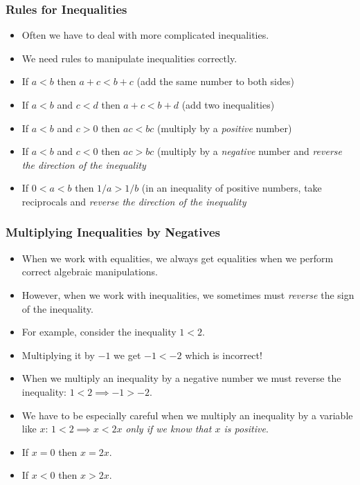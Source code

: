 \documentclass[serif,ignorenonframetext]{beamer}
\begin{document}
\begin{frame}
  \frametitle{Rules for Inequalities}
  \begin{itemize}[<+->]
  \item Often we have to deal with more complicated inequalities.
  \item We need rules to manipulate inequalities correctly.
  \item If $a<b$ then $a+c<b+c$ (add the same number to both sides)
  \item If $a<b$ and $c<d$ then $a+c<b+d$ (add two inequalities)
  \item If $a<b$ and $c>0$ then $ac<bc$ (multiply by a \textit{positive} number)
  \item If $a<b$ and $c<0$ then $ac>bc$ (multiply by a \textit{negative}
    number and \textit{reverse the direction of the inequality}
  \item If $0<a<b$ then $1/a > 1/b$ (in an inequality of positive numbers,
    take reciprocals and \textit{reverse the direction of the inequality}
  \end{itemize}
\end{frame}

\begin{frame}
  \frametitle{Multiplying Inequalities by Negatives}
  \begin{itemize}[<+->]
  \item When we work with equalities, we always get equalities when we perform
    correct algebraic manipulations.
  \item However, when we work with inequalities, we sometimes must 
    \textit{reverse} the sign of the inequality.
  \item For example, consider the inequality $1<2$.
  \item Multiplying it by $-1$ we get $-1<-2$ which is incorrect!
  \item When we multiply an inequality by a negative number we must reverse
    the inequality: $1<2 \implies -1>-2$.
  \item We have to be especially careful when we multiply an inequality by
    a variable like $x$: $1<2 \implies x<2x$ \textit{only if we know that
    $x$ is positive}.
  \item If $x=0$ then $x=2x$.
  \item If $x<0$ then $x>2x$.
  \end{itemize}
\end{frame}
\end{document}
